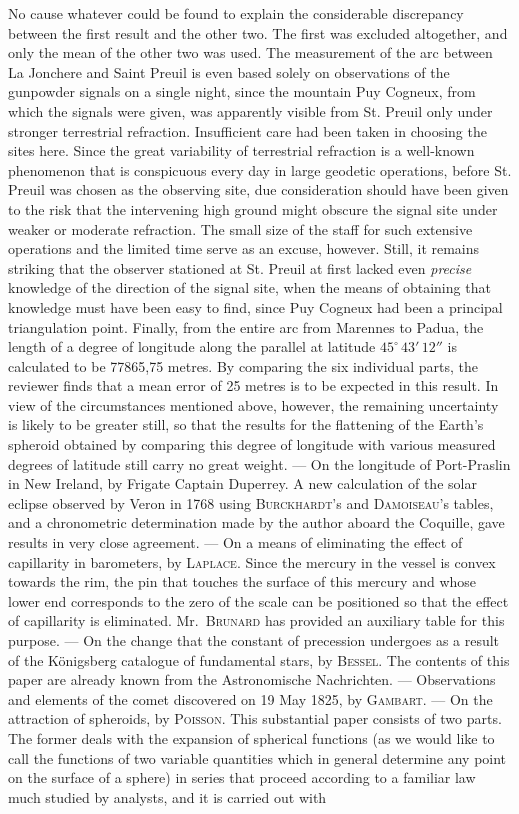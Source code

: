 \noindent No cause whatever could be found to explain the considerable discrepancy between the first result and the other two. The first was excluded altogether, and only the mean of the other two was used. The measurement of the arc between La Jonchere and Saint Preuil is even based solely on observations of the gunpowder signals on a single night, since the mountain Puy Cogneux, from which the signals were given, was apparently visible from St. Preuil only under stronger terrestrial refraction. Insufficient care had been taken in choosing the sites here. Since the great variability of terrestrial refraction is a well-known phenomenon that is conspicuous every day in large geodetic operations, before St. Preuil was chosen as the observing site, due consideration should have been given to the risk that the intervening high ground might obscure the signal site under weaker or moderate refraction. The small size of the staff for such extensive operations and the limited time serve as an excuse, however. Still, it remains striking that the observer stationed at St. Preuil at first lacked even \emph{precise} knowledge of the direction of the signal site, when the means of obtaining that knowledge must have been easy to find, since Puy Cogneux had been a principal triangulation point. Finally, from the entire arc from Marennes to Padua, the length of a degree of longitude along the parallel at latitude $45^\circ\,43'\,12''$ is calculated to be 77865,75 metres. By comparing the six individual parts, the reviewer finds that a mean error of 25 metres is to be expected in this result. In view of the circumstances mentioned above, however, the remaining uncertainty is likely to be greater still, so that the results for the flattening of the Earth's spheroid obtained by comparing this degree of longitude with various measured degrees of latitude still carry no great weight. — On the longitude of Port-Praslin in New Ireland, by Frigate Captain Duperrey. A new calculation of the solar eclipse observed by Veron in 1768 using \textsc{Burckhardt}'s and \textsc{Damoiseau}'s tables, and a chronometric determination made by the author aboard the Coquille, gave results in very close agreement. — On a means of eliminating the effect of capillarity in barometers, by \textsc{Laplace}. Since the mercury in the vessel is convex towards the rim, the pin that touches the surface of this mercury and whose lower end corresponds to the zero of the scale can be positioned so that the effect of capillarity is eliminated. Mr.\ \textsc{Brunard} has provided an auxiliary table for this purpose. — On the change that the constant of  precession undergoes as a result of the Königsberg catalogue of fundamental stars, by \textsc{Bessel}. The contents of this paper are already known from the Astronomische Nachrichten. --- Observations and elements of the comet discovered on 19 May 1825, by \textsc{Gambart}. --- On the attraction of spheroids, by \textsc{Poisson}. This substantial paper consists of two parts. The former deals with the expansion of spherical functions (as we would like to call the functions of two variable quantities which in general determine any point on the surface of a sphere) in series that proceed according to a familiar law much studied by analysts, and it is carried out with 